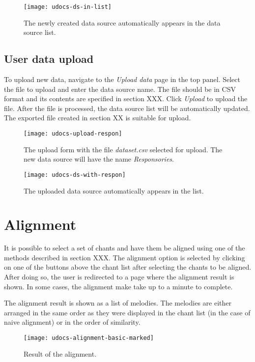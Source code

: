 \begin{figure}[!h]
\centering
\texttt{[image: udocs-ds-in-list]}
\caption{The newly created data source automatically appears in the data source list.}
\label{fig:update-ds-antiphons}
\end{figure}

\subsection{User data upload}

To upload new data, navigate to the \emph{Upload data} page in the top panel. Select the file to upload and enter the data source name. The file should be
in CSV format and its contents are specified in section XXX. Click \emph{Upload} to upload the file. After the file is processed, the data source list will
be automatically updated. The exported file created in section XX is suitable for upload.

\begin{figure}[!h]
\centering
\texttt{[image: udocs-upload-respon]}
\caption{The upload form with the file \emph{dataset.csv} selected for upload. The new data source will have the name \emph{Responsories}.}
\label{fig:upload-ds}
\end{figure}

\begin{figure}[!h]
\centering
\texttt{[image: udocs-ds-with-respon]}
\caption{The uploaded data source automatically appears in the list.}
\label{fig:update-ds-respon}
\end{figure}

\section{Alignment}

It is possible to select a set of chants and have them be aligned using one of the methods described in section XXX. The alignment option is selected by clicking
on one of the buttons above the chant list after selecting the chants to be aligned. After doing so, the user is redirected to a page where the alignment result
is shown. In some cases, the alignment make take up to a minute to complete.

The alignment result is shown as a list of melodies. The melodies are either arranged in the same order as they were displayed in the chant list (in the case of
naive alignment) or in the order of similarity.

\begin{figure}[!h]
\centering
\texttt{[image: udocs-alignment-basic-marked]}
\caption{Result of the alignment.}
\label{fig:align-result}
\end{figure}

